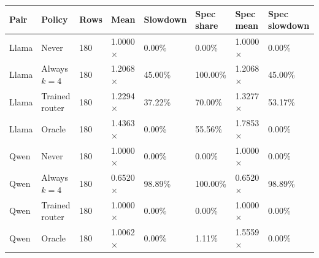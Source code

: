 \begin{tabular}{llllllll}
\toprule
Pair & Policy & Rows & Mean & Slowdown & Spec share & Spec mean & Spec slowdown \\
\midrule
Llama & Never & 180 & 1.0000$\times$ & 0.00\% & 0.00\% & 1.0000$\times$ & 0.00\% \\
Llama & Always $k=4$ & 180 & 1.2068$\times$ & 45.00\% & 100.00\% & 1.2068$\times$ & 45.00\% \\
Llama & Trained router & 180 & 1.2294$\times$ & 37.22\% & 70.00\% & 1.3277$\times$ & 53.17\% \\
Llama & Oracle & 180 & 1.4363$\times$ & 0.00\% & 55.56\% & 1.7853$\times$ & 0.00\% \\
Qwen & Never & 180 & 1.0000$\times$ & 0.00\% & 0.00\% & 1.0000$\times$ & 0.00\% \\
Qwen & Always $k=4$ & 180 & 0.6520$\times$ & 98.89\% & 100.00\% & 0.6520$\times$ & 98.89\% \\
Qwen & Trained router & 180 & 1.0000$\times$ & 0.00\% & 0.00\% & 1.0000$\times$ & 0.00\% \\
Qwen & Oracle & 180 & 1.0062$\times$ & 0.00\% & 1.11\% & 1.5559$\times$ & 0.00\% \\
\bottomrule
\end{tabular}
